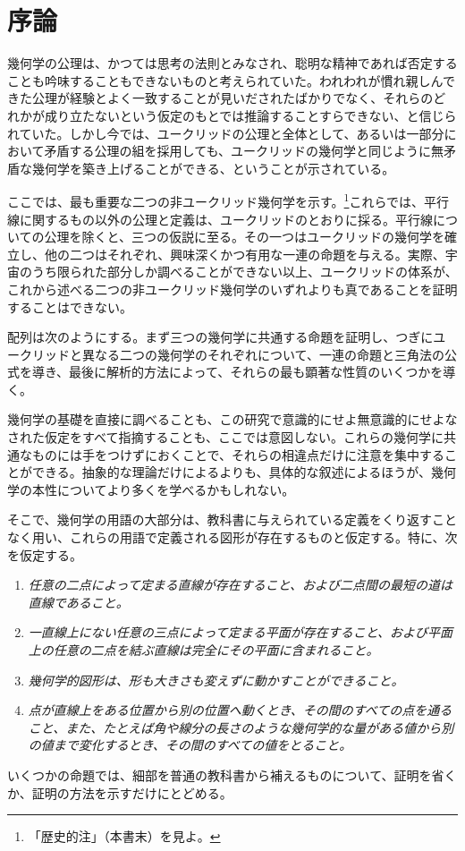 \chapter{序論}

幾何学の公理は、かつては思考の法則とみなされ、聡明な精神であれば否定することも吟味することもできないものと考えられていた。われわれが慣れ親しんできた公理が経験とよく一致することが見いだされたばかりでなく、それらのどれかが成り立たないという仮定のもとでは推論することすらできない、と信じられていた。しかし今では、ユークリッドの公理と全体として、あるいは一部分において矛盾する公理の組を採用しても、ユークリッドの幾何学と同じように無矛盾な幾何学を築き上げることができる、ということが示されている。

ここでは、最も重要な二つの非ユークリッド幾何学を示す。\footnote{「歴史的注」（本書末）を見よ。}これらでは、平行線に関するもの以外の公理と定義は、ユークリッドのとおりに採る。平行線についての公理を除くと、三つの仮説に至る。その一つはユークリッドの幾何学を確立し、他の二つはそれぞれ、興味深くかつ有用な一連の命題を与える。実際、宇宙のうち限られた部分しか調べることができない以上、ユークリッドの体系が、これから述べる二つの非ユークリッド幾何学のいずれよりも真であることを証明することはできない。

配列は次のようにする。まず三つの幾何学に共通する命題を証明し、つぎにユークリッドと異なる二つの幾何学のそれぞれについて、一連の命題と三角法の公式を導き、最後に解析的方法によって、それらの最も顕著な性質のいくつかを導く。

幾何学の基礎を直接に調べることも、この研究で意識的にせよ無意識的にせよなされた仮定をすべて指摘することも、ここでは意図しない。これらの幾何学に共通なものには手をつけずにおくことで、それらの相違点だけに注意を集中することができる。抽象的な理論だけによるよりも、具体的な叙述によるほうが、幾何学の本性についてより多くを学べるかもしれない。

そこで、幾何学の用語の大部分は、教科書に与えられている定義をくり返すことなく用い、これらの用語で定義される図形が存在するものと仮定する。特に、次を仮定する。
\smallskip

\begin{enumerate}
\item[I.] \emph{任意の二点によって定まる直線が存在すること、および二点間の最短の道は直線であること。}

\item[II.] \emph{一直線上にない任意の三点によって定まる平面が存在すること、および平面上の任意の二点を結ぶ直線は完全にその平面に含まれること。}

\item[III.] \emph{幾何学的図形は、形も大きさも変えずに動かすことができること。}

\item[IV.] \emph{点が直線上をある位置から別の位置へ動くとき、その間のすべての点を通ること、また、たとえば角や線分の長さのような幾何学的な量がある値から別の値まで変化するとき、その間のすべての値をとること。}
\end{enumerate}

いくつかの命題では、細部を普通の教科書から補えるものについて、証明を省くか、証明の方法を示すだけにとどめる。
